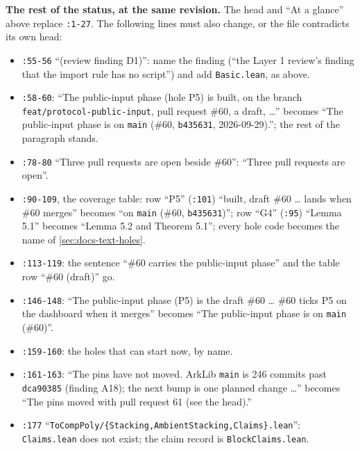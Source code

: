 \begin{sloppypar}
\textbf{The rest of the status, at the same revision.} The head and ``At a glance'' above replace \texttt{:\allowbreak{}1-\allowbreak{}27}. The following lines must also change, or the file contradicts its own head:
\end{sloppypar}

\begin{itemize}
\item \texttt{:\allowbreak{}55-\allowbreak{}56} ``(review finding D1)'': name the finding (``the Layer 1 review's finding that the import rule has no script'') and add \texttt{Basic.\allowbreak{}lean}, as above.
\item \texttt{:\allowbreak{}58-\allowbreak{}60}: ``The public-input phase (hole P5) is built, on the branch \texttt{feat/\allowbreak{}protocol-\allowbreak{}public-\allowbreak{}input}, pull request \#60, a draft, …'' becomes ``The public-input phase is on \texttt{main} (\#60, \texttt{b435631}, 2026-09-29).''; the rest of the paragraph stands.
\item \texttt{:\allowbreak{}78-\allowbreak{}80} ``Three pull requests are open beside \#60'': ``Three pull requests are open''.
\item \texttt{:\allowbreak{}90-\allowbreak{}109}, the coverage table: row ``P5'' (\texttt{:\allowbreak{}101}) ``built, draft \#60 … lands when \#60 merges'' becomes ``on \texttt{main} (\#60, \texttt{b435631})''; row ``G4'' (\texttt{:\allowbreak{}95}) ``Lemma 5.1'' becomes ``Lemma 5.2 and Theorem 5.1''; every hole code becomes the name of \cref{sec:docs-text-holes}.
\item \texttt{:\allowbreak{}113-\allowbreak{}119}: the sentence ``\#60 carries the public-input phase'' and the table row ``\#60 (draft)'' go.
\item \texttt{:\allowbreak{}146-\allowbreak{}148}: ``The public-input phase (P5) is the draft \#60 … \#60 ticks P5 on the dashboard when it merges'' becomes ``The public-input phase is on \texttt{main} (\#60)''.
\item \texttt{:\allowbreak{}159-\allowbreak{}160}: the holes that can start now, by name.
\item \texttt{:\allowbreak{}161-\allowbreak{}163}: ``The pins have not moved. ArkLib \texttt{main} is 246 commits past \texttt{dca90385} (finding A18); the next bump is one planned change …'' becomes ``The pins moved with pull request 61 (see the head).''
\item \texttt{:\allowbreak{}177} ``\texttt{To\allowbreak{}Comp\allowbreak{}Poly/\allowbreak{}\{\allowbreak{}Stacking,\allowbreak{}Ambient\allowbreak{}Stacking,\allowbreak{}Claims\}.\allowbreak{}lean}'': \texttt{Claims.\allowbreak{}lean} does not exist; the claim record is \texttt{Block\allowbreak{}Claims.\allowbreak{}lean}.

\end{itemize}
